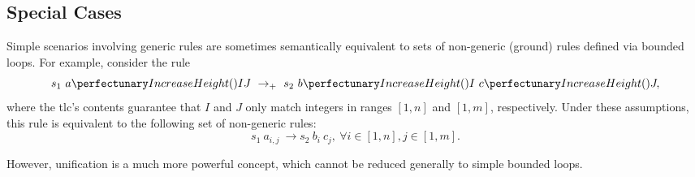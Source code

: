 \subsection{Special Cases}
Simple scenarios involving generic rules are sometimes 
semantically equivalent to sets of non-generic (ground) rules defined via bounded loops.
For example, consider the rule
\[
s_1 ~ \cpfunc{a}{IJ} ~ \rightarrow_\cpmaxpar ~ s_2 ~ \cpfunc{b}{I} ~ \cpfunc{c}{J},
\]
where the \gls{tlc}'s contents guarantee that \(I\) and \(J\) 
only match integers in ranges \([1,n]\) and \([1,m]\), respectively.
Under these assumptions, 
this rule is equivalent to the following set of non-generic rules:
\[
s_1 ~ a_{i,j} ~ \rightarrow s_2 ~ b_i ~ c_j, ~ \forall i \in [1,n], j \in [1,m].
\]

However, unification is a much more powerful concept, 
which cannot be reduced generally to simple bounded loops.